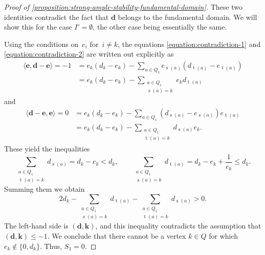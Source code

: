 \documentclass[11pt]{article}
\theoremstyle{plain}
\theoremstyle{definition}
\DeclareMathOperator\source{s}
\DeclareMathOperator\target{t}
\newcommand\tuple[1]{\ensuremath{{\boldsymbol{#1}}}}
\begin{document}
\begin{proof}[Proof of \cref{proposition:strong-ample-stability-fundamental-domain}]
These two identities contradict the fact that $\tuple{d}$ belongs to the fundamental domain.
We will show this for the case $I' = \emptyset$, the other case being essentially the same.

Using the conditions on~$e_i$ for~$i\neq k$,
the equations \eqref{equation:contradiction-1} and \eqref{equation:contradiction-2} are written out explicitly as\vspace*{-3pt}
\begin{equation*}
\begin{aligned}
\langle \tuple{e}, \tuple{d} - \tuple{e} \rangle = -1
&= e_k(d_k - e_k) - \sum_{a \in Q_1}e_{\source(a)}(d_{\target(a)} - e_{\target(a)}) \\
&= e_k(d_k - e_k) - \sum_{\substack{a\in Q_1 \\ \source(a)=k}} e_{k} d_{\target(a)}
\end{aligned}
\end{equation*}
and\vspace*{-3pt}
\begin{equation*}
\begin{aligned}
\langle \tuple{d} - \tuple{e}, \tuple{e} \rangle = 0
&= e_k(d_k - e_k) - \sum_{a \in Q_1}(d_{\source(a)} - e_{\source(a)})e_{\target(a)} \\
&= e_k(d_k - e_k) - \sum_{\substack{a\in Q_1 \\ \target(a)=k}} d_{\source(a)} e_{k}.
\end{aligned}
\end{equation*}
These yield the inequalities\vspace*{-3pt}
\begin{equation*}
\sum_{\substack{a\in Q_1 \\ \target(a)=k}} d_{\source(a)} = d_k - e_k < d_k, \qquad
\sum_{\substack{a\in Q_1 \\ \source(a)=k}} d_{\target(a)} = d_k - e_k + \frac{1}{e_k} \leq d_k.
\end{equation*}
Summing them we obtain\vspace*{-3pt}
\begin{equation*}
2d_k - \sum_{\substack{a\in Q_1 \\ \source(a)=k}} d_{\target(a)} - \sum_{\substack{a\in Q_1\\\target(a)=k}} d_{\source(a)} > 0.
\end{equation*}
The left-hand side is $(\tuple{d},\tuple{k})$, and
this inequality contradicts the assumption that $(\tuple{d},\tuple{k}) \leq -1$.
We conclude that there cannot be a vertex $k \in Q$ for which $e_k \notin \{0,d_k\}$.
Thus, $S_1 = 0$.


\end{proof}
\end{document}
